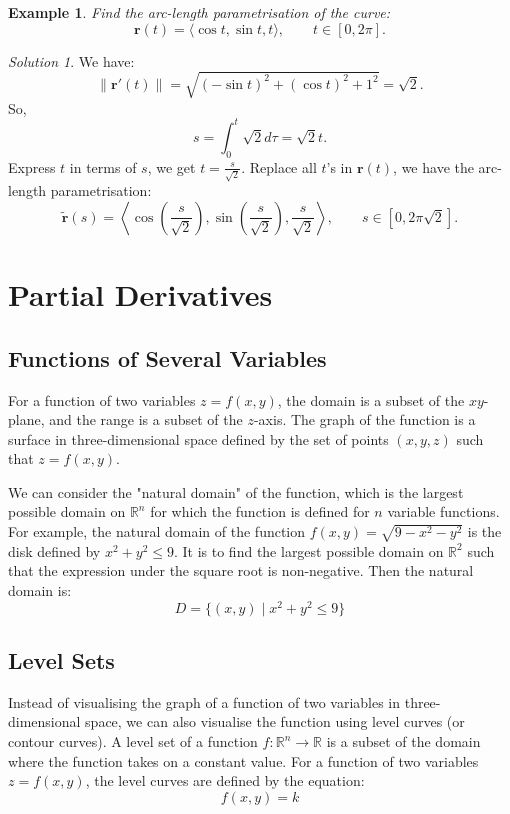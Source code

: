 \documentclass{book}
\newtheorem{example}{Example}[chapter]
\theoremstyle{remark}
\newtheorem*{solution}{Solution}
\begin{document}
\begin{example}
    Find the arc-length parametrisation of the curve:
    \[
        \mathbf{r}(t) = \langle \cos t, \sin t, t \rangle, \qquad t \in [0, 2\pi].
    \]
\end{example}
\begin{solution}
    We have:
    \[
        \| \mathbf{r}'(t) \| = \sqrt{(-\sin t)^2 + (\cos t)^2 + 1^2} = \sqrt{2}.
    \]
    So,
    \[
        s = \int_0^t \sqrt{2} d\tau = \sqrt{2} t.
    \]
    Express $t$ in terms of $s$, we get $t = \frac{s}{\sqrt{2}}$. Replace all $t$'s in $\mathbf{r}(t)$, we have the arc-length parametrisation:
    \[
        \tilde{\mathbf{r}}(s) = \left\langle \cos\left(\frac{s}{\sqrt{2}}\right), \sin\left(\frac{s}{\sqrt{2}}\right), \frac{s}{\sqrt{2}} \right\rangle, \qquad s \in [0, 2\pi\sqrt{2}].
    \]
\end{solution}


\chapter{Partial Derivatives}

\section{Functions of Several Variables}
For a function of two variables $z = f(x, y)$, the domain is a subset of the $xy$-plane, and the range is a subset of the $z$-axis. The graph of the function is a surface in three-dimensional space defined by the set of points $(x, y, z)$ such that $z = f(x, y)$. 

We can consider the "natural domain" of the function, which is the largest possible domain on $\mathbb{R}^n$ for which the function is defined for $n$ variable functions. For example, the natural domain of the function $f(x, y) = \sqrt{9 - x^2 - y^2}$ is the disk defined by $x^2 + y^2 \leq 9$. It is to find the largest possible domain on $\mathbb{R}^2$ such that the expression under the square root is non-negative. Then the natural domain is:
\[
    D = \{ (x, y) \mid x^2 + y^2 \leq 9 \}
\]

\section{Level Sets}
Instead of visualising the graph of a function of two variables in three-dimensional space, we can also visualise the function using level curves (or contour curves). A level set of a function $f: \mathbb{R}^n \to \mathbb{R}$ is a subset of the domain where the function takes on a constant value. For a function of two variables $z = f(x, y)$, the level curves are defined by the equation:
\[
    f(x, y) = k
\]
\end{document}
